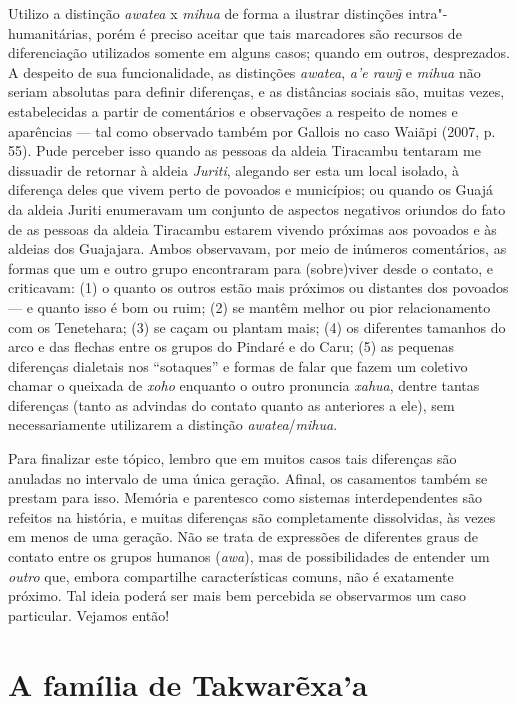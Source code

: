Utilizo a distinção \emph{awatea} x \emph{mihua} de forma a ilustrar
distinções intra"-humanitárias, porém é preciso aceitar que tais
marcadores são recursos de diferenciação utilizados somente em alguns
casos; quando em outros, desprezados. A despeito de sua funcionalidade,
as distinções \emph{awatea}, \emph{a'e rawỹ} e \emph{mihua} não seriam
absolutas para definir diferenças, e as distâncias sociais são, muitas
vezes, estabelecidas a partir de comentários e observações a respeito de
nomes e aparências --- tal como observado também por Gallois no caso
Waiãpi (2007, p. 55). Pude perceber isso quando as pessoas da aldeia
Tiracambu tentaram me dissuadir de retornar à aldeia \emph{Juriti},
alegando ser esta um local isolado, à diferença deles que vivem perto de
povoados e municípios; ou quando os Guajá da aldeia Juriti enumeravam um
conjunto de aspectos negativos oriundos do fato de as pessoas da aldeia
Tiracambu estarem vivendo próximas aos povoados e às aldeias dos
Guajajara. Ambos observavam, por meio de inúmeros comentários, as formas
que um e outro grupo encontraram para (sobre)viver desde o contato, e
criticavam: (1) o quanto os outros estão mais próximos ou distantes dos
povoados --- e quanto isso é bom ou ruim; (2) se mantêm melhor ou pior
relacionamento com os Tenetehara; (3) se caçam ou plantam mais; (4) os
diferentes tamanhos do arco e das flechas entre os grupos do Pindaré e
do Caru; (5) as pequenas diferenças dialetais nos ``sotaques'' e formas
de falar que fazem um coletivo chamar o queixada de \emph{xoho} enquanto
o outro pronuncia \emph{xahua}, dentre tantas diferenças (tanto as
advindas do contato quanto as anteriores a ele), sem necessariamente
utilizarem a distinção \emph{awatea}/\emph{mihua}.

Para finalizar este tópico, lembro que em muitos casos tais diferenças
são anuladas no intervalo de uma única geração. Afinal, os casamentos
também se prestam para isso. Memória e parentesco como sistemas
interdependentes são refeitos na história, e muitas diferenças são
completamente dissolvidas, às vezes em menos de uma geração. Não se
trata de expressões de diferentes graus de contato entre os grupos
humanos (\emph{awa}), mas de possibilidades de entender um \emph{outro}
que, embora compartilhe características comuns, não é exatamente
próximo. Tal ideia poderá ser mais bem percebida se observarmos um caso
particular. Vejamos então!

\section{A família de Takwarẽxa'a}\label{a-famuxedlia-de-takwarexaa}

